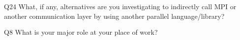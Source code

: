\begin{description}%
\item{Q24} What, if any, alternatives are you investigating to indirectly call MPI or another communication layer by using another parallel language/library?%
\item{Q8} What is your major role at your place of work?%
\end{description}%
